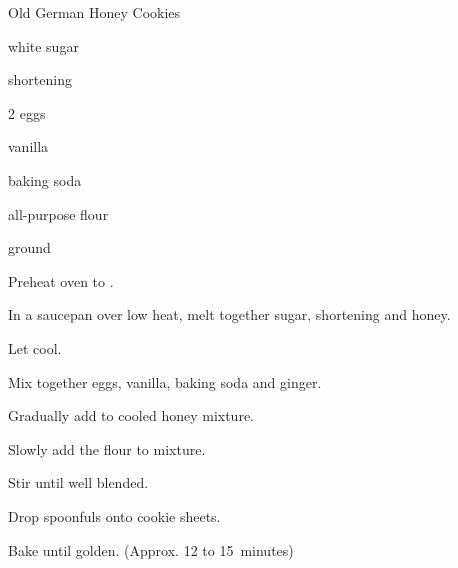 \begin{recipe}{Old German Honey Cookies}{}{}

\begin{ingredients}
\item {} white sugar
\item {} shortening
\item {} 
\item 2 eggs
\item {} vanilla
\item {} baking soda
\item {} all-purpose flour
\item {} ground 
\end{ingredients}

\begin{directions}
\item Preheat oven to .
\item In a saucepan over low heat, melt together sugar, shortening and honey. 
\item Let cool.
\item Mix together eggs, vanilla, baking soda and ginger.
\item Gradually add to cooled honey mixture.
\item Slowly add the flour to mixture.
\item Stir until well blended.
\item Drop spoonfuls onto cookie sheets.
\item Bake until golden. (Approx. 12 to 15~minutes)
\end{directions}
\end{recipe}
